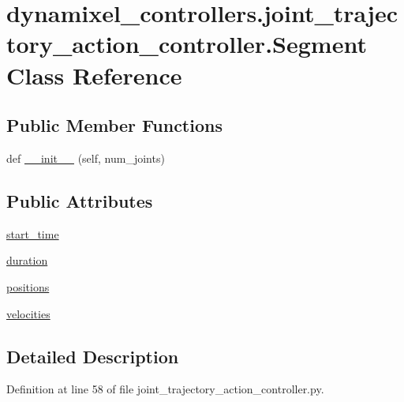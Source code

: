 \hypertarget{classdynamixel__controllers_1_1joint__trajectory__action__controller_1_1_segment}{}\section{dynamixel\+\_\+controllers.\+joint\+\_\+trajectory\+\_\+action\+\_\+controller.\+Segment Class Reference}
\label{classdynamixel__controllers_1_1joint__trajectory__action__controller_1_1_segment}
\subsection*{Public Member Functions}
\begin{DoxyCompactItemize}
\item 
def \hyperlink{classdynamixel__controllers_1_1joint__trajectory__action__controller_1_1_segment_afdf6876c4b21210155efff6130f39e6b}{\+\_\+\+\_\+init\+\_\+\+\_\+} (self, num\+\_\+joints)
\end{DoxyCompactItemize}
\subsection*{Public Attributes}
\begin{DoxyCompactItemize}
\item 
\hyperlink{classdynamixel__controllers_1_1joint__trajectory__action__controller_1_1_segment_a5a758d0924870faa6b979183ce6e75ee}{start\+\_\+time}
\item 
\hyperlink{classdynamixel__controllers_1_1joint__trajectory__action__controller_1_1_segment_a3e9c6839fe1e3203f877ddedd884e706}{duration}
\item 
\hyperlink{classdynamixel__controllers_1_1joint__trajectory__action__controller_1_1_segment_a24c8e34529d6284cbd5d148fe5e67c54}{positions}
\item 
\hyperlink{classdynamixel__controllers_1_1joint__trajectory__action__controller_1_1_segment_abbbbd6c6fd75f91cf2ea77d341d5fb16}{velocities}
\end{DoxyCompactItemize}


\subsection{Detailed Description}


Definition at line 58 of file joint\+\_\+trajectory\+\_\+action\+\_\+controller.\+py.



